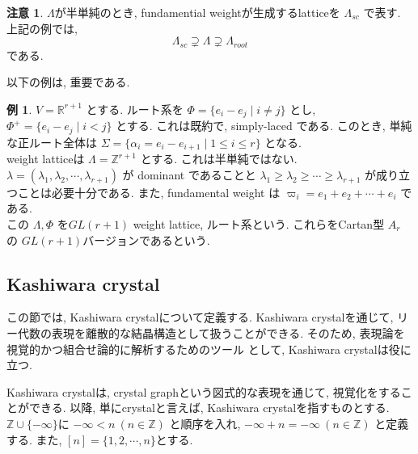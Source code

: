 \documentclass[
  a4paper, 
  12pt,
  ja=standard,
  xelatex,
  left=30truemm,
  right=30truemm,
  titlepage 
]{bxjsarticle}
\theoremstyle{definition}
\newtheorem*{ex}{例}
\newtheorem*{re}{注意}
\begin{document}
\begin{re}
  $\Lambda$が半単純のとき, fundamential weightが生成するlatticeを $\Lambda_{sc}$ で表す. 上記の例では,
  $$ \Lambda_{sc} \supsetneq \Lambda \supsetneq \Lambda_{root}$$
  である.
\end{re}


以下の例は, 重要である.

\begin{ex}
  $V = \mathbb{R}^{r+1}$ とする. ルート系を $\Phi = \{ e_i - e_j \mid i \neq j \}$ とし, $\Phi^{+} = \{ e_i - e_j \mid i < j \}$ とする.
  これは既約で, simply-laced である. このとき, 単純な正ルート全体は $\Sigma = \{ \alpha_i = e_i - e_{i+1} \mid 1 \leq i \leq r \}$ となる. \\
  weight latticeは $\Lambda = \mathbb{Z}^{r+1}$ とする. これは半単純ではない. \\
  $\lambda = (\lambda_1, \lambda_2, \cdots, \lambda_{r+1})$ が dominant であることと $\lambda_1 \geq \lambda_2 \geq \cdots \geq \lambda_{r+1}$
  が成り立つことは必要十分である. また, fundamental weight は $\varpi_i = e_1 + e_2 + \cdots + e_i$ である. \\
  この $\Lambda, \Phi$ を$GL(r + 1)$ weight lattice, ルート系という. これらをCartan型 $A_r$ の $GL(r + 1)$バージョンであるという.
\end{ex}


%
\subsection{Kashiwara crystal}
この節では, Kashiwara crystalについて定義する. Kashiwara crystalを通じて, リー代数の表現を離散的な結晶構造として扱うことができる. そのため, 表現論を視覚的かつ組合せ論的に解析するためのツール
として, Kashiwara crystalは役に立つ. 

Kashiwara crystalは, crystal graphという図式的な表現を通じて, 視覚化をすることができる. 以降, 単にcrystalと言えば, Kashiwara crystalを指すものとする.
\\

$\mathbb{Z} \cup \{ - \infty \} $に $- \infty < n \ ( n \in \mathbb{Z} ) $ と順序を入れ, $ - \infty + n = - \infty \ ( n \in \mathbb{Z} ) $
と定義する. また, $ [n] = \{ 1, 2, \cdots , n \} $とする.
\end{document}
